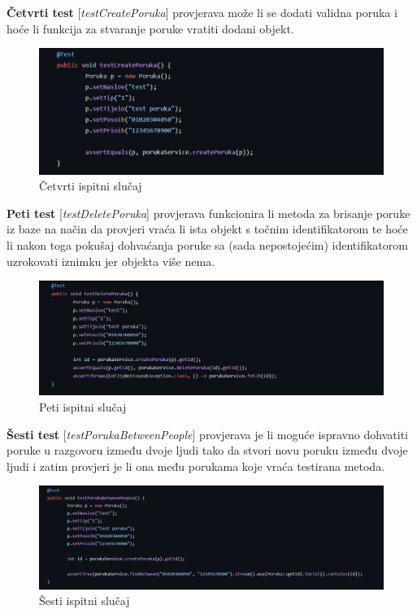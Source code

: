 			\noindent \textbf{Četvrti test} [\textit{testCreatePoruka}] provjerava može li se dodati validna poruka i hoće li funkcija za stvaranje poruke vratiti dodani objekt.
			\begin{figure}[H]
				\includegraphics[width=\textwidth]{slike/junit_4.png}
				\caption{Četvrti ispitni slučaj}
				\label{fig:junit_4}
			\end{figure}
			
		 	\noindent \textbf{Peti test} [\textit{testDeletePoruka}] provjerava funkcionira li metoda za brisanje poruke iz baze na način da provjeri vraća li ista objekt s točnim identifikatorom te hoće li nakon toga pokušaj dohvaćanja poruke sa (sada nepostojećim) identifikatorom uzrokovati iznimku jer objekta više nema.
		 	\begin{figure}[H]
		 		\includegraphics[width=\textwidth]{slike/junit_5.png}
		 		\caption{Peti ispitni slučaj}
		 		\label{fig:junit_5}
		 	\end{figure}
		 	
		 	\noindent \textbf{Šesti test} [\textit{testPorukaBetweenPeople}] provjerava je li moguće ispravno dohvatiti poruke u razgovoru između dvoje ljudi tako da stvori novu poruku između dvoje ljudi i zatim provjeri je li ona među porukama koje vraća testirana metoda. 
		 	\begin{figure}[H]
		 		\includegraphics[width=\textwidth]{slike/junit_6.png}
		 		\caption{Šesti ispitni slučaj}
		 		\label{fig:junit_6}
		 	\end{figure}
		 	

